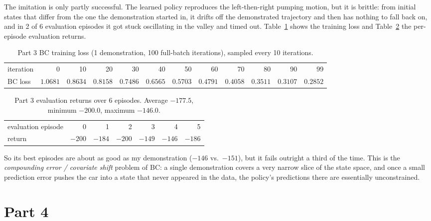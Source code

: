 \documentclass[12pt]{article}%
\begin{document}
The imitation is only partly successful. The learned policy reproduces the left-then-right
pumping motion, but it is brittle: from initial states that differ from the one the
demonstration started in, it drifts off the demonstrated trajectory and then has nothing to
fall back on, and in 2 of 6 evaluation episodes it got stuck oscillating in the valley and
timed out. Table~\ref{tab:p3loss} shows the training loss
and Table~\ref{tab:p3eval} the per-episode evaluation returns.

\begin{table}[h]
\centering
\footnotesize
\setlength{\tabcolsep}{4pt}
\caption{Part 3 BC training loss (1 demonstration, 100 full-batch iterations), sampled every 10 iterations.}
\label{tab:p3loss}
\begin{tabular}{@{}l*{11}{r}@{}}
\toprule
iteration & 0 & 10 & 20 & 30 & 40 & 50 & 60 & 70 & 80 & 90 & 99 \\
BC loss & $1.0681$ & $0.8634$ & $0.8158$ & $0.7486$ & $0.6565$ & $0.5703$ & $0.4791$ & $0.4058$ & $0.3511$ & $0.3107$ & $0.2852$ \\
\bottomrule
\end{tabular}
\end{table}
\begin{table}[h]
\centering
\small
\caption{Part 3 evaluation returns over 6 episodes. Average $-177.5$, minimum $-200.0$, maximum $-146.0$.}
\label{tab:p3eval}
\begin{tabular}{l*{6}{r}}
\toprule
evaluation episode & 0 & 1 & 2 & 3 & 4 & 5 \\
return & $-200$ & $-184$ & $-200$ & $-149$ & $-146$ & $-186$ \\
\bottomrule
\end{tabular}

\end{table}

So its best episodes are about as good as my demonstration ($-146$ vs.\ $-151$), but it
fails outright a third of the time. This is the \emph{compounding error /
covariate shift} problem of BC: a single demonstration covers a very narrow slice of the
state space, and once a small prediction error pushes the car into a state that never
appeared in the data, the policy's predictions there are essentially unconstrained.




\section{Part 4}
\end{document}
